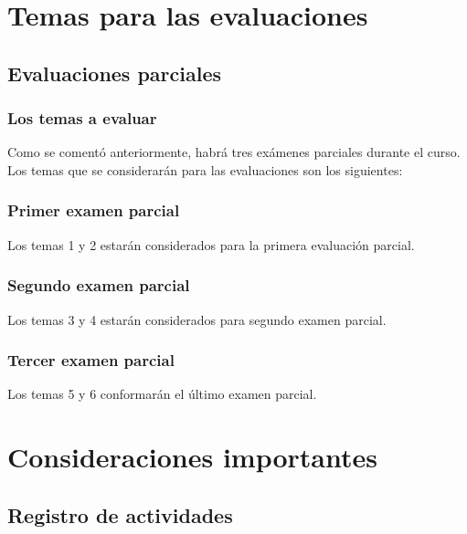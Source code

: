 \documentclass[12pt]{beamer}
\begin{document}
\section{Temas para las evaluaciones}
\subsection{Evaluaciones parciales}

\begin{frame}
\frametitle{Los temas a evaluar}
Como se comentó anteriormente, habrá tres exámenes parciales durante el curso.
\\
\bigskip
\pause
Los temas que se considerarán para las evaluaciones son los siguientes:
\end{frame}
\begin{frame}
\frametitle{Primer examen parcial}
Los temas 1 y 2 estarán considerados para la primera evaluación parcial.
\end{frame}
\begin{frame}
\frametitle{Segundo examen parcial}
Los temas 3 y 4 estarán considerados para segundo examen parcial.
\end{frame}
\begin{frame}
\frametitle{Tercer examen parcial}
Los temas 5 y 6 conformarán el último examen parcial.
\end{frame}

\section{Consideraciones importantes}
\subsection{Registro de actividades}
\end{document}
